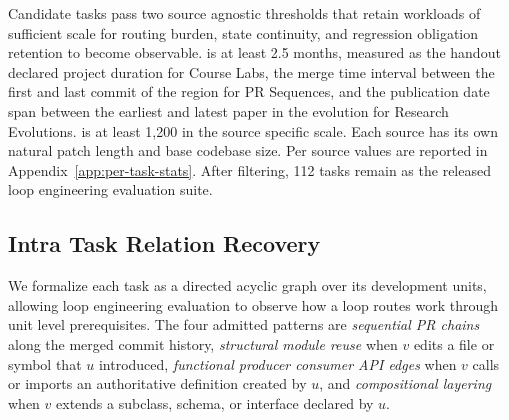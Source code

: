 Candidate tasks pass two source agnostic thresholds that retain workloads of sufficient scale for routing burden, state continuity, and regression obligation retention to become observable.  is at least 2.5 months, measured as the handout declared project duration for Course Labs, the merge time interval between the first and last commit of the region for PR Sequences, and the publication date span between the earliest and latest paper in the evolution for Research Evolutions.  is at least 1{,}200 in the source specific scale. Each source has its own natural patch length and base codebase size. Per source values are reported in Appendix~\ref{app:per-task-stats}.
After filtering, 112 tasks remain as the released loop engineering evaluation suite.

\vspace{-3pt}
\subsection{Intra Task Relation Recovery}\label{sec:dag-framework}


We formalize each task as a directed acyclic graph over its development units, allowing loop engineering evaluation to observe how a loop routes work through unit level prerequisites.  The four admitted patterns are \emph{sequential PR chains} along the merged commit history, \emph{structural module reuse} when $v$ edits a file or symbol that $u$ introduced, \emph{functional producer consumer API edges} when $v$ calls or imports an authoritative definition created by $u$, and \emph{compositional layering} when $v$ extends a subclass, schema, or interface declared by $u$.


